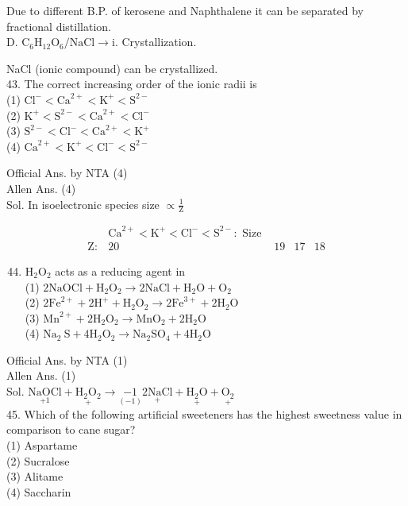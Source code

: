 \documentclass[10pt]{article}
\begin{document}
Due to different B.P. of kerosene and Naphthalene it can be separated by fractional distillation.\\
D. \(\mathrm{C}_{6} \mathrm{H}_{12} \mathrm{O}_{6} / \mathrm{NaCl} \rightarrow \mathrm{i}\). Crystallization.

NaCl (ionic compound) can be crystallized.\\
43. The correct increasing order of the ionic radii is\\
(1) \(\mathrm{Cl}^{-}<\mathrm{Ca}^{2+}<\mathrm{K}^{+}<\mathrm{S}^{2-}\)\\
(2) \(\mathrm{K}^{+}<\mathrm{S}^{2-}<\mathrm{Ca}^{2+}<\mathrm{Cl}^{-}\)\\
(3) \(\mathrm{S}^{2-}<\mathrm{Cl}^{-}<\mathrm{Ca}^{2+}<\mathrm{K}^{+}\)\\
(4) \(\mathrm{Ca}^{2+}<\mathrm{K}^{+}<\mathrm{Cl}^{-}<\mathrm{S}^{2-}\)

Official Ans. by NTA (4)\\
Allen Ans. (4)\\
Sol. In isoelectronic species size \(\propto \frac{1}{\mathrm{Z}}\)

\[
\begin{array}{rlrrl} 
& \mathrm{Ca}^{2+}<\mathrm{K}^{+}<\mathrm{Cl}^{-}<\mathrm{S}^{2-}: \text { Size } \\
\mathrm{Z}: & 20 & 19 & 17 & 18
\end{array}
\]

\begin{enumerate}
  \setcounter{enumi}{43}
  \item \(\mathrm{H}_{2} \mathrm{O}_{2}\) acts as a reducing agent in\\
(1) \(2 \mathrm{NaOCl}+\mathrm{H}_{2} \mathrm{O}_{2} \rightarrow 2 \mathrm{NaCl}+\mathrm{H}_{2} \mathrm{O}+\mathrm{O}_{2}\)\\
(2) \(2 \mathrm{Fe}^{2+}+2 \mathrm{H}^{+}+\mathrm{H}_{2} \mathrm{O}_{2} \rightarrow 2 \mathrm{Fe}^{3+}+2 \mathrm{H}_{2} \mathrm{O}\)\\
(3) \(\mathrm{Mn}^{2+}+2 \mathrm{H}_{2} \mathrm{O}_{2} \rightarrow \mathrm{MnO}_{2}+2 \mathrm{H}_{2} \mathrm{O}\)\\
(4) \(\mathrm{Na}_{2} \mathrm{~S}+4 \mathrm{H}_{2} \mathrm{O}_{2} \rightarrow \mathrm{Na}_{2} \mathrm{SO}_{4}+4 \mathrm{H}_{2} \mathrm{O}\)
\end{enumerate}

Official Ans. by NTA (1)\\
Allen Ans. (1)\\
Sol. \(\underset{+1}{\mathrm{NaOCl}}+\underset{+}{\mathrm{H}_{2} \mathrm{O}_{2}} \longrightarrow \underset{(-1)}{-1} \underset{+}{2 \mathrm{NaCl}}+\underset{+}{\mathrm{H}_{2} \mathrm{O}}+\underset{+}{\mathrm{O}_{2}}\)\\
45. Which of the following artificial sweeteners has the highest sweetness value in comparison to cane sugar?\\
(1) Aspartame\\
(2) Sucralose\\
(3) Alitame\\
(4) Saccharin
\end{document}
